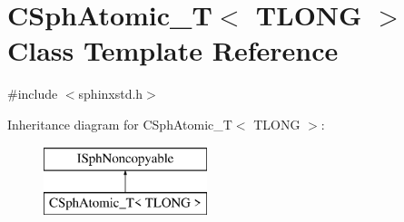 \hypertarget{classCSphAtomic__T}{\section{C\-Sph\-Atomic\-\_\-\-T$<$ T\-L\-O\-N\-G $>$ Class Template Reference}
\label{classCSphAtomic__T}
}


{\ttfamily \#include $<$sphinxstd.\-h$>$}

Inheritance diagram for C\-Sph\-Atomic\-\_\-\-T$<$ T\-L\-O\-N\-G $>$\-:\begin{figure}[H]
\begin{center}
\leavevmode
\includegraphics[height=2.000000cm]{classCSphAtomic__T}
\end{center}
\end{figure}

